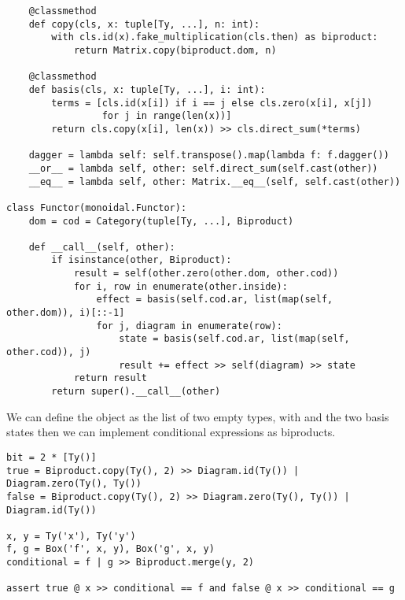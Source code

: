 \begin{python}
\begin{verbatim}
    @classmethod
    def copy(cls, x: tuple[Ty, ...], n: int):
        with cls.id(x).fake_multiplication(cls.then) as biproduct:
            return Matrix.copy(biproduct.dom, n)

    @classmethod
    def basis(cls, x: tuple[Ty, ...], i: int):
        terms = [cls.id(x[i]) if i == j else cls.zero(x[i], x[j])
                 for j in range(len(x))]
        return cls.copy(x[i], len(x)) >> cls.direct_sum(*terms)

    dagger = lambda self: self.transpose().map(lambda f: f.dagger())
    __or__ = lambda self, other: self.direct_sum(self.cast(other))
    __eq__ = lambda self, other: Matrix.__eq__(self, self.cast(other))

class Functor(monoidal.Functor):
    dom = cod = Category(tuple[Ty, ...], Biproduct)

    def __call__(self, other):
        if isinstance(other, Biproduct):
            result = self(other.zero(other.dom, other.cod))
            for i, row in enumerate(other.inside):
                effect = basis(self.cod.ar, list(map(self, other.dom)), i)[::-1]
                for j, diagram in enumerate(row):
                    state = basis(self.cod.ar, list(map(self, other.cod)), j)
                    result += effect >> self(diagram) >> state
            return result
        return super().__call__(other)
\end{verbatim}
\end{python}

\begin{example}
We can define the object  as the list of two empty types, with  and  the two basis states
then we can implement conditional expressions as biproducts.

\begin{verbatim}
bit = 2 * [Ty()]
true = Biproduct.copy(Ty(), 2) >> Diagram.id(Ty()) | Diagram.zero(Ty(), Ty())
false = Biproduct.copy(Ty(), 2) >> Diagram.zero(Ty(), Ty()) | Diagram.id(Ty())

x, y = Ty('x'), Ty('y')
f, g = Box('f', x, y), Box('g', x, y)
conditional = f | g >> Biproduct.merge(y, 2)

assert true @ x >> conditional == f and false @ x >> conditional == g
\end{verbatim}
\end{example}

